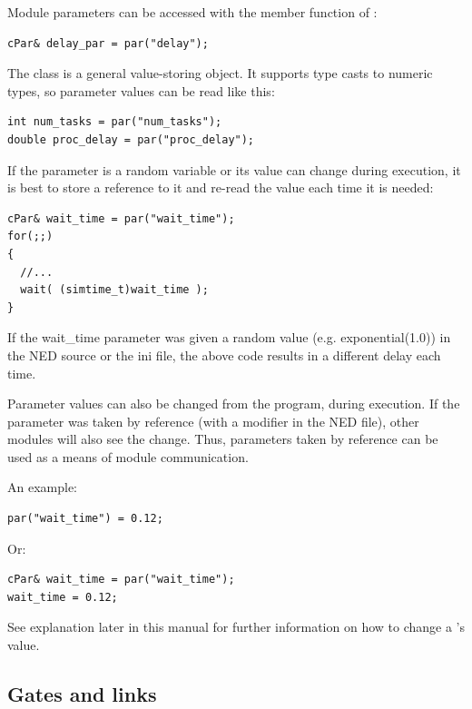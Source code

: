 Module parameters can be accessed
with the  member function of :

\begin{Verbatim}
cPar& delay_par = par("delay");
\end{Verbatim}

The  class is a general value-storing object. It supports 
type casts to numeric types, so parameter values can be read 
like this:

\begin{Verbatim}
int num_tasks = par("num_tasks");
double proc_delay = par("proc_delay");
\end{Verbatim}

If the parameter is a random variable or its value can change 
during execution, it is best to store a reference to it and re-read 
the value each time it is needed:

\begin{Verbatim}
cPar& wait_time = par("wait_time");
for(;;)
{
  //...
  wait( (simtime_t)wait_time );
}
\end{Verbatim}

If the wait\_time parameter was given a random value (e.g. exponential(1.0)) 
in the NED source or the ini file, the above code results in 
a different delay each time.

Parameter values can also be changed from the program, during
execution. If the parameter was taken by reference
 (with a
 modifier in the NED file), other modules
will also see the change.  Thus, parameters taken by reference can be
used as a means of module communication.


An example:

\begin{Verbatim}
par("wait_time") = 0.12;
\end{Verbatim}

Or:

\begin{Verbatim}
cPar& wait_time = par("wait_time");
wait_time = 0.12;
\end{Verbatim}


See  explanation later in this manual for further information 
on how to change a 's value.



\subsection{Gates and links}

